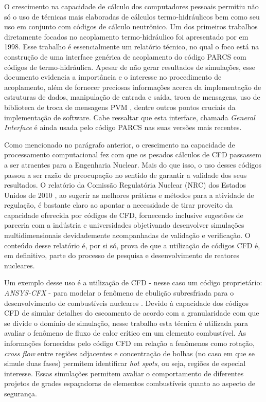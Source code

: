 O crescimento na capacidade de cálculo dos computadores pessoais permitiu não só o uso 
de técnicas mais elaboradas de cálculos termo-hidráulicos bem como seu uso em conjunto 
com códigos de cálculo neutrônico. Um dos primeiros trabalhos diretamente focados no 
acoplamento termo-hidráulico foi apresentado por \cite{Barber98} em 1998. Esse trabalho 
é essencialmente um relatório técnico, no qual o foco está na construção de uma interface 
genérica de acoplamento do código PARCS com códigos de termo-hidráulica. Apesar de não 
gerar resultados de simulações, esse documento evidencia a importância e o interesse 
no procedimento de acoplamento, além de fornecer preciosas informações acerca da 
implementação de estruturas de dados, manipulação de entrada e saída, troca de mensagens, 
uso de biblioteca de troca de mensagens PVM \cite{Geist94}, dentre outros pontos cruciais
da implementação de software. Cabe ressaltar que esta interface, 
chamada \textit{General Interface} é ainda usada pelo código PARCS nas suas versões mais 
recentes. 

Como mencionado no parágrafo anterior, o crescimento na capacidade de processamento
computacional 
fez com que os pesados cálculos de CFD passassem a ser atraentes 
para a Engenharia Nuclear. Mais do que isso, o uso desses códigos passou a ser razão 
de preocupação no sentido de garantir a validade dos seus resultados. O relatório 
da Comissão Regulatória Nuclear (NRC) dos Estados Unidos de 2010 \cite[p.69]{NUREG2010}, 
ao sugerir as melhores práticas e métodos para a atividade de regulação, é bastante claro 
ao apontar a necessidade de tirar proveito da capacidade oferecida por códigos de CFD, 
fornecendo inclusive sugestões de parceria com a indústria e universidades objetivando 
desenvolver simulações multidimensionais devidademente acompanhadas de validação e
verificação. O conteúdo desse relatório é, por si só, prova de que a utilização de 
códigos CFD é, em definitivo, parte do processo de 
pesquisa e desenvolvimento de reatores nucleares. 

Um exemplo desse uso é a utilização de CFD - nesse caso um código proprietário: 
\textit{ANSYS-CFX} - para modelar o fenômeno de ebulição subresfriada para o 
desenvolvimento de combustíveis nucleares \cite{Krepper2007}. Devido à capacidade 
dos códigos CFD de simular detalhes do escoamento de acordo com a granularidade com que se
divide o domínio de simulação, nesse trabalho esta técnica é utilizada para avaliar 
o fenômeno de fluxo de calor crítico em um elemento combustível. As informações 
fornecidas pelo código CFD em relação a fenômenos como rotação, \textit{cross flow} entre 
regiões adjacentes e concentração de bolhas (no caso em que se simule duas fases)
permitem identificar \textit{hot spots}, ou seja, regiões de especial interesse.
Essas simulações permitem avaliar o comportamento
de diferentes projetos de grades espaçadoras de elementos combustíveis quanto ao aspecto 
de segurança.

